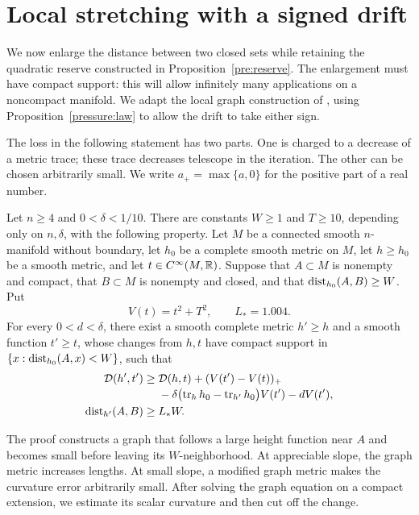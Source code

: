 \section{Local stretching with a signed drift}
\label{sec:stretching}

We now enlarge the distance between two closed sets while retaining the
quadratic reserve constructed in Proposition~\ref{pre:reserve}.  The enlargement
must have compact support: this will allow infinitely many applications on
a noncompact manifold.  We adapt the local graph construction of
\cite[Theorem~3.1]{OpenAIWidth}, using Proposition~\ref{pressure:law} to allow the drift
to take either sign.

The loss in the following statement has two parts.  One is charged to a
decrease of a metric trace; these trace decreases telescope in the
iteration.  The other can be chosen arbitrarily small.  We write $a_+=\max\{a,0\}$ for the positive
part of a real number.

\begin{lemma}\label{stretch:local}
Let $n\ge4$ and $0<\delta<1/10$.  There are constants $W\ge1$ and $T\ge10$,
depending only on $n,\delta$, with the following property.  Let $M$ be a
connected smooth $n$-manifold without boundary, let $h_0$ be a complete
smooth metric on $M$, let $h\ge h_0$ be a smooth metric, and let
$t\in C^\infty(M,\mathbb R)$.  Suppose that $A\subset M$ is nonempty and compact,
that $B\subset M$ is nonempty and closed, and that
$\operatorname{dist}_{h_0}(A,B)\ge W$.  Put
\[
 V(t)=t^2+T^2,\qquad L_*=1.004.
\]
For every $0<d<\delta$, there exist a smooth complete metric $h'\ge h$ and
a smooth function $t'\ge t$, whose changes from $h,t$ have compact support
in $\{x:\operatorname{dist}_{h_0}(A,x)<W\}$, such that
\begin{align}
 \mathcal D(h',t')\ge{}&\mathcal D(h,t)+(V(t')-V(t))_+
 \notag\\[-2pt]
 &-\delta\bigl(\operatorname{tr}_hh_0-\operatorname{tr}_{h'}h_0\bigr)V(t')-dV(t'),
 \label{stretch:conclusion}\\
 \operatorname{dist}_{h'}(A,B)\ge{}&L_*W.
 \label{stretch:distance-conclusion}
\end{align}
\end{lemma}

The proof constructs a graph that follows a large height function near
$A$ and becomes small before leaving its $W$-neighborhood.  At appreciable
slope, the graph metric increases lengths.  At small slope, a modified
graph metric makes the curvature error arbitrarily small.  After solving
the graph equation on a compact extension, we estimate its scalar
curvature and then cut off the change.

